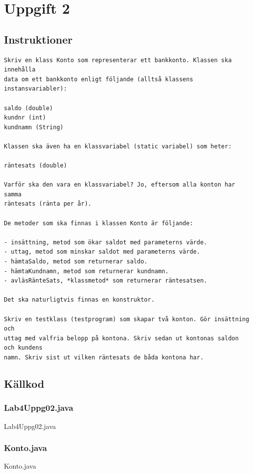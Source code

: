 \section{Uppgift 2}\label{sec:uppg02}

\subsection{Instruktioner}
\begin{Verbatim}[fontsize=\small]
Skriv en klass Konto som representerar ett bankkonto. Klassen ska innehålla
data om ett bankkonto enligt följande (alltså klassens instansvariabler):

saldo (double)
kundnr (int)
kundnamn (String)

Klassen ska även ha en klassvariabel (static variabel) som heter:

räntesats (double)

Varför ska den vara en klassvariabel? Jo, eftersom alla konton har samma
räntesats (ränta per år).

De metoder som ska finnas i klassen Konto är följande:

- insättning, metod som ökar saldot med parameterns värde.
- uttag, metod som minskar saldot med parameterns värde.
- hämtaSaldo, metod som returnerar saldo.
- hämtaKundnamn, metod som returnerar kundnamn.
- avläsRänteSats, *klassmetod* som returnerar räntesatsen.

Det ska naturligtvis finnas en konstruktor.

Skriv en testklass (testprogram) som skapar två konton. Gör insättning och
uttag med valfria belopp på kontona. Skriv sedan ut kontonas saldon och kundens
namn. Skriv sist ut vilken räntesats de båda kontona har.
\end{Verbatim}


\subsection{Källkod}
\subsubsection{Lab4Uppg02.java}
\caption{Lab4Uppg02.java}
\label{src:uppg02}

\subsubsection{Konto.java}
\caption{Konto.java}
\label{src:konto}


